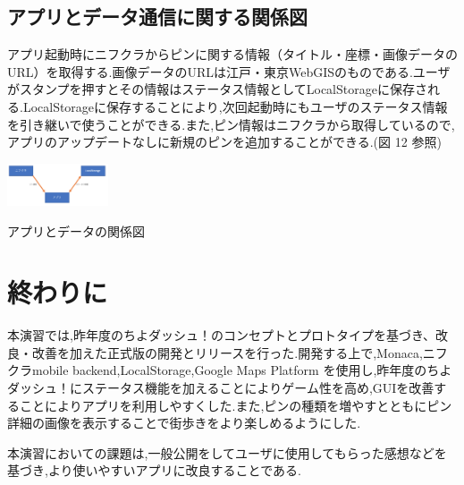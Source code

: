 \documentclass[a4paper, twoside]{jarticle}
\makeatletter
\newenvironment{figurehere}
  {\def\@captype{figure}}
  {}
\makeatother
\begin{document}
\begin{multicols}{2}
\subsection{アプリとデータ通信に関する関係図}
アプリ起動時にニフクラからピンに関する情報（タイトル・座標・画像データのURL）を取得する.画像データのURLは江戸・東京WebGISのものである.ユーザがスタンプを押すとその情報はステータス情報としてLocalStorageに保存される.LocalStorageに保存することにより,次回起動時にもユーザのステータス情報を引き継いで使うことができる.また,ピン情報はニフクラから取得しているので,アプリのアップデートなしに新規のピンを追加することができる.(図 12 参照)
\begin{figurehere}
\begin{center}
\includegraphics[bb=30 100 550 500,width=3cm]{./image12.png}%
\end{center}
\caption{アプリとデータの関係図}\label{fig:12}
\end{figurehere}


\section{終わりに}
本演習では,昨年度のちよダッシュ！のコンセプトとプロトタイプを基づき、改良・改善を加えた正式版の開発とリリースを行った.開発する上で,Monaca,ニフクラmobile backend,LocalStorage,Google Maps Platform を使用し,昨年度のちよダッシュ！にステータス機能を加えることによりゲーム性を高め,GUIを改善することによりアプリを利用しやすくした.また,ピンの種類を増やすとともにピン詳細の画像を表示することで街歩きをより楽しめるようにした.\par
本演習においての課題は,一般公開をしてユーザに使用してもらった感想などを基づき,より使いやすいアプリに改良することである.



\end{multicols} %
\vspace{1cm}
\end{document}
